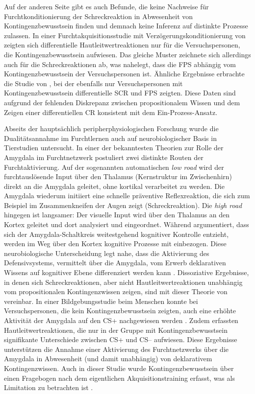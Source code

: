 		Auf der anderen Seite gibt es auch Befunde, die keine Nachweise für Furchtkonditionierung der Schreckreaktion in Abwesenheit von Kontingenzbewusstsein finden und demnach keine Inferenz auf distinkte Prozesse zulassen. In einer Furchtakquisitionsstudie mit Verzögerungskonditionierung von \textcite{PURKIS2001} zeigten sich differentielle Hautleitwertreaktionen nur für die Versuchspersonen, die Kontingenzbewusstsein aufwiesen. Das gleiche Muster zeichnete sich allerdings auch für die Schreckreaktionen ab, was nahelegt, dass die FPS abhängig vom Kontingenzbewusstsein der Versuchspersonen ist.
		Ähnliche Ergebnisse erbrachte die Studie von \textcite{GRILLON2002}, bei der ebenfalls nur Versuchspersonen mit Kontingenzbewusstsein differentielle SCR und FPS zeigten.
		Diese Daten sind aufgrund der fehlenden Diskrepanz zwischen propositionalem Wissen und dem Zeigen einer differentiellen CR konsistent mit dem Ein-Prozess-Ansatz. 
		
		
		Abseits der hauptsächlich peripherphysiologischen Forschung wurde die Dualitätsannahme im Furchtlernen auch auf neurobiologischer Basis in Tierstudien untersucht. In einer der bekanntesten Theorien zur Rolle der Amygdala im Furchtnetzwerk postuliert \textcite{LEDOUX2003} zwei distinkte Routen der Furchtaktivierung. Auf der sogenannten automatischen \textit{low road} wird der furchtauslösende Input über den Thalamus (Kernstruktur im Zwischenhirn) direkt an die Amygdala geleitet, ohne kortikal verarbeitet zu werden. Die Amygdala wiederum initiiert eine schnelle präventive Reflexreaktion, die sich zum Beispiel im Zusammenkneifen der Augen zeigt (Schreckreaktion). Die \textit{high road} hingegen ist langsamer: Der visuelle Input wird über den Thalamus an den Kortex geleitet und dort analysiert und eingeordnet. Während \textcite{LEDOUX1996} argumentiert, dass sich der Amygdala-Schaltkreis weitestgehend kognitiver Kontrolle entzieht, werden im Weg über den Kortex kognitive Prozesse mit einbezogen.
		Diese neurobiologische Unterscheidung legt nahe, dass die Aktivierung des Defensivsystems, vermittelt über die Amygdala, vom Erwerb deklarativen Wissens auf kognitiver Ebene differenziert werden kann \parencite{OEHMANN2001}. Dissoziative Ergebnisse, in denen sich Schreckreaktionen, aber nicht Hautleitwertreaktionen unabhängig vom propositionalen Kontingenzwissen zeigen, sind mit dieser Theorie von \textcite{LEDOUX2003} vereinbar.
		In einer Bildgebungsstudie beim Menschen konnte bei Versuchspersonen, die kein Kontingenzbewusstsein zeigten, auch eine erhöhte Aktivität der Amygdala auf den CS+ nachgewiesen werden \parencite{TABBERT2006}. Zudem erfassten \textcite{TABBERT2006} Hautleitwertreaktionen, die nur in der Gruppe mit Kontingenzbewusstsein signifikante Unterschiede zwischen CS+ und CS-- aufwiesen. Diese Ergebnisse unterstützen die Annahme einer Aktivierung des Furchtnetzwerks über die Amygdala in Abwesenheit (und damit unabhängig) von deklarativem Kontingenzwissen. Auch in dieser Studie wurde Kontingenzbewusstsein über einen Fragebogen nach dem eigentlichen Akquisitionstraining erfasst, was als Limitation zu betrachten ist \parencite{MERTENS2020}. %
		
